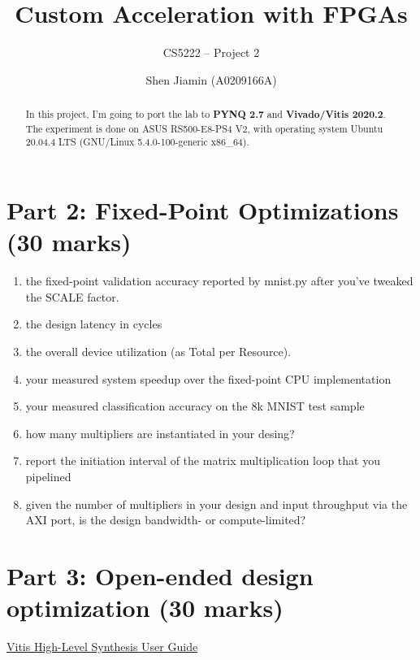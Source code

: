 \documentclass[screen,nonacm]{acmart}
\begin{document}
\title{
  Custom Acceleration with FPGAs
}
\subtitle{
  CS5222 -- Project 2
}

\author{Shen Jiamin (A0209166A)}

\begin{abstract}
  In this project, I'm going to port the lab to \textbf{PYNQ 2.7} and \textbf{Vivado/Vitis 2020.2}.
  The experiment is done on ASUS RS500-E8-PS4 V2, with operating system 
  Ubuntu 20.04.4 LTS (GNU/Linux 5.4.0-100-generic x86\_64).
\end{abstract}

\maketitle 




\section{Part 2: Fixed-Point Optimizations (30 marks)}

\begin{enumerate}
  \item the fixed-point validation accuracy reported by mnist.py after you've tweaked the SCALE factor.
  \item the design latency in cycles
  \item the overall device utilization (as Total per Resource).
  \item your measured system speedup over the fixed-point CPU implementation
  \item your measured classification accuracy on the 8k MNIST test sample
  \item how many multipliers are instantiated in your desing?
  \item report the initiation interval of the matrix multiplication loop that you pipelined
  \item given the number of multipliers in your design and input throughput via the AXI port, is the design bandwidth- or compute-limited?
\end{enumerate}

\section{Part 3: Open-ended design optimization (30 marks)}

\href{https://www.xilinx.com/support/documentation/sw_manuals/xilinx2020_2/ug1399-vitis-hls.pdf}{Vitis High-Level Synthesis User Guide}


% 
% 

\clearpage
\appendix
\end{document}
